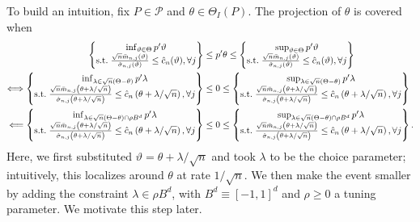 \documentclass[letterpaper,11pt]{article}
\theoremstyle{myplain}
\theoremstyle{mydefinition}
\theoremstyle{myremark}
\numberwithin{equation}{section}
\numberwithin{figure}{section}
\begin{document}
To build an intuition, fix $P\in\mathcal P$ and $\theta\in\Theta_I(P)$. The projection of $\theta$ is covered when
\begin{align}
\begin{Bmatrix} \inf_{\vartheta\in\Theta} p'\vartheta   \\ \text{s.t.} \; \frac{\sqrt n \bar{m}_{n,j}(\vartheta)}{\hat\sigma_{n,j}(\vartheta)}\le  \hat{c}_n(\vartheta), \forall j \end{Bmatrix} & \le   p'\theta  \le  \begin{Bmatrix} \sup_{\vartheta\in\Theta} p'\vartheta   \\ \text{s.t.} \; \frac{\sqrt n \bar{m}_{n,j}(\vartheta)}{\hat\sigma_{n,j}(\vartheta)}\le  \hat{c}_n(\vartheta), \forall j \end{Bmatrix} \notag \\
	 \Longleftrightarrow  \begin{Bmatrix} \inf_{\lambda\in \sqrt n(\Theta-\theta)} p'\lambda  \\ \text{s.t.} \; \frac{\sqrt n\bar{m}_{n,j}\left(\theta+\lambda/\sqrt n\right)}{\hat\sigma_{n,j}\left(\theta+\lambda/\sqrt n\right)}\le  \hat{c}_n\left(\theta+\lambda/\sqrt n\right), \forall j \end{Bmatrix} & \leq 0  \leq \begin{Bmatrix} \sup_{\lambda\in \sqrt n(\Theta-\theta)} p'\lambda   \\ \text{s.t.} \; \frac{\sqrt n\bar{m}_{n,j}\left(\theta+\lambda/\sqrt n\right)}{\hat\sigma_{n,j}\left(\theta+\lambda/\sqrt n\right)}\le  \hat{c}_n\left(\theta+\lambda/\sqrt n\right), \forall j \end{Bmatrix} \notag \\
	  \Longleftarrow  \begin{Bmatrix} \inf_{\lambda\in \sqrt n(\Theta-\theta) \cap \rho B^d} p'\lambda  \\ \text{s.t.} \; \frac{\sqrt n\bar{m}_{n,j}\left(\theta+\lambda/\sqrt n\right)}{\hat\sigma_{n,j}\left(\theta+\lambda/\sqrt n\right)}\le  \hat{c}_n\left(\theta+\lambda/\sqrt n\right), \forall j \end{Bmatrix} & \leq 0  \leq \begin{Bmatrix} \sup_{\lambda\in \sqrt n(\Theta-\theta) \cap \rho B^d} p'\lambda   \\ \text{s.t.} \; \frac{\sqrt n\bar{m}_{n,j}\left(\theta+\lambda/\sqrt n\right)}{\hat\sigma_{n,j}\left(\theta+\lambda/\sqrt n\right)}\le  \hat{c}_n\left(\theta+\lambda/\sqrt n\right), \forall j \end{Bmatrix}.
	 \label{eq:heuristic}
\end{align}
Here, we first substituted $\vartheta=\theta+\lambda/\sqrt n$ and took $\lambda$ to be the choice parameter; intuitively, this localizes around $\theta$ at rate $1/\sqrt{n}$. We then make the event smaller by adding the constraint $\lambda \in \rho B^d$, with $B^d \equiv [-1,1]^d$ and $\rho \geq 0$ a tuning parameter. We motivate this step later.
\end{document}
